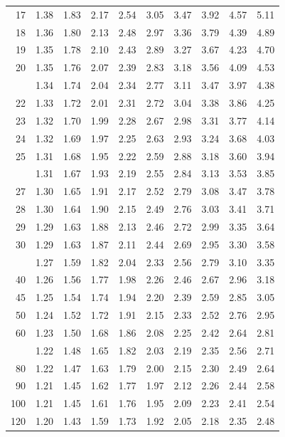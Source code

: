 \documentclass[10pt]{article}
\begin{document}
\begin{longtable}{@{}r!{\vrule width 0.8pt\hspace{0.55em}}rrrrrrrrr@{}}
17 & 1.38 & 1.83 & 2.17 & 2.54 & 3.05 & 3.47 & 3.92 & 4.57 & 5.11 \\
18 & 1.36 & 1.80 & 2.13 & 2.48 & 2.97 & 3.36 & 3.79 & 4.39 & 4.89 \\
19 & 1.35 & 1.78 & 2.10 & 2.43 & 2.89 & 3.27 & 3.67 & 4.23 & 4.70 \\
20 & 1.35 & 1.76 & 2.07 & 2.39 & 2.83 & 3.18 & 3.56 & 4.09 & 4.53 \\
 & 1.34 & 1.74 & 2.04 & 2.34 & 2.77 & 3.11 & 3.47 & 3.97 & 4.38 \\
22 & 1.33 & 1.72 & 2.01 & 2.31 & 2.72 & 3.04 & 3.38 & 3.86 & 4.25 \\
23 & 1.32 & 1.70 & 1.99 & 2.28 & 2.67 & 2.98 & 3.31 & 3.77 & 4.14 \\
24 & 1.32 & 1.69 & 1.97 & 2.25 & 2.63 & 2.93 & 3.24 & 3.68 & 4.03 \\
25 & 1.31 & 1.68 & 1.95 & 2.22 & 2.59 & 2.88 & 3.18 & 3.60 & 3.94 \\
 & 1.31 & 1.67 & 1.93 & 2.19 & 2.55 & 2.84 & 3.13 & 3.53 & 3.85 \\
27 & 1.30 & 1.65 & 1.91 & 2.17 & 2.52 & 2.79 & 3.08 & 3.47 & 3.78 \\
28 & 1.30 & 1.64 & 1.90 & 2.15 & 2.49 & 2.76 & 3.03 & 3.41 & 3.71 \\
29 & 1.29 & 1.63 & 1.88 & 2.13 & 2.46 & 2.72 & 2.99 & 3.35 & 3.64 \\
30 & 1.29 & 1.63 & 1.87 & 2.11 & 2.44 & 2.69 & 2.95 & 3.30 & 3.58 \\
 & 1.27 & 1.59 & 1.82 & 2.04 & 2.33 & 2.56 & 2.79 & 3.10 & 3.35 \\
40 & 1.26 & 1.56 & 1.77 & 1.98 & 2.26 & 2.46 & 2.67 & 2.96 & 3.18 \\
45 & 1.25 & 1.54 & 1.74 & 1.94 & 2.20 & 2.39 & 2.59 & 2.85 & 3.05 \\
50 & 1.24 & 1.52 & 1.72 & 1.91 & 2.15 & 2.33 & 2.52 & 2.76 & 2.95 \\
60 & 1.23 & 1.50 & 1.68 & 1.86 & 2.08 & 2.25 & 2.42 & 2.64 & 2.81 \\
 & 1.22 & 1.48 & 1.65 & 1.82 & 2.03 & 2.19 & 2.35 & 2.56 & 2.71 \\
80 & 1.22 & 1.47 & 1.63 & 1.79 & 2.00 & 2.15 & 2.30 & 2.49 & 2.64 \\
90 & 1.21 & 1.45 & 1.62 & 1.77 & 1.97 & 2.12 & 2.26 & 2.44 & 2.58 \\
100 & 1.21 & 1.45 & 1.61 & 1.76 & 1.95 & 2.09 & 2.23 & 2.41 & 2.54 \\
120 & 1.20 & 1.43 & 1.59 & 1.73 & 1.92 & 2.05 & 2.18 & 2.35 & 2.48 \\

\end{longtable}
\end{document}

